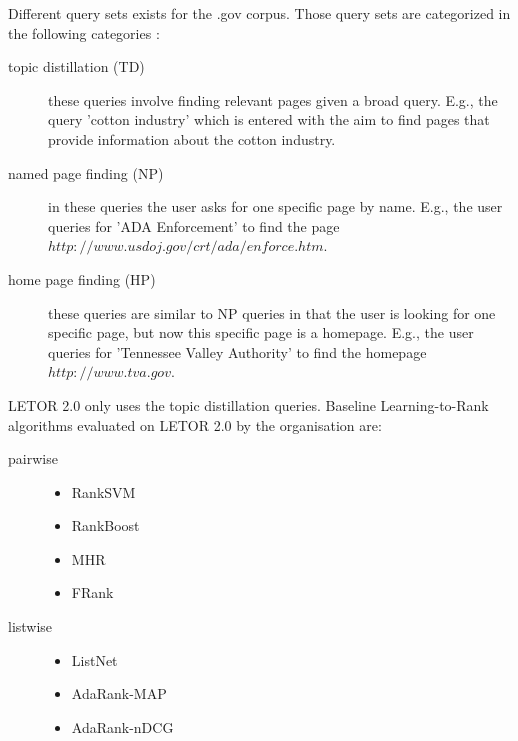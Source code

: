Different query sets exists for the .gov corpus. Those query sets are categorized in the following categories \cite{Craswell2003}:
\begin{description}
\item[topic distillation (TD)]these queries involve finding relevant pages given a broad query. E.g., the query 'cotton industry' which is entered with the aim to find pages that provide information about the cotton industry.
\item[named page finding (NP)]in these queries the user asks for one specific page by name. E.g., the user queries for 'ADA Enforcement' to find the page $http://www.usdoj.gov/crt/ada/enforce.htm$.
\item[home page finding (HP)]these queries are similar to NP queries in that the user is looking for one specific page, but now this specific page is a homepage. E.g., the user queries for 'Tennessee Valley Authority' to find the homepage $http://www.tva.gov$.
\end{description}

LETOR 2.0 only uses the topic distillation queries. Baseline Learning-to-Rank algorithms evaluated on LETOR 2.0 by the organisation are:
\begin{description}
\item[pairwise]{\leavevmode
	\begin{itemize}
	\item Rank\ac{SVM} \cite{Herbrich1999,Joachims2002}
	\item RankBoost \cite{Freund2003}
	\item \ac{MHR} \cite{Qin2007}
	\item FRank \cite{Tsai2007}
	\end{itemize}}
\item[listwise]{\leavevmode
	\begin{itemize}
	\item ListNet \cite{Cao2007}
	\item AdaRank-MAP \cite{Xu2007}
	\item AdaRank-nDCG \cite{Xu2007}
	\end{itemize}}
\end{description} 

